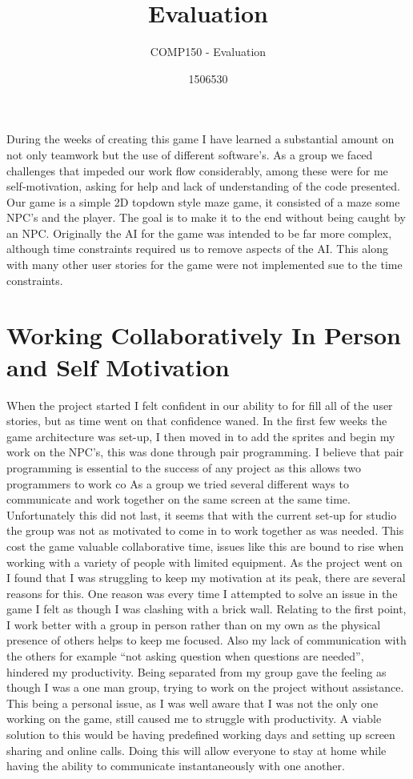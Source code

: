 \documentclass{scrartcl}
\title{Evaluation}
\subtitle{COMP150 - Evaluation}
\author{1506530}
\begin{document}
\maketitle
During the weeks of creating this game I have learned a substantial amount on not only teamwork but the use of different software's. As a group we faced challenges that impeded our work flow considerably, among these were for me self-motivation, asking for help and lack of understanding of the code presented. Our game is a simple 2D topdown style maze game, it consisted of a maze some NPC's and the player. The goal is to make it to the end without being caught by an NPC. Originally the AI for the game was intended to be far more complex, although time constraints required us to remove aspects of the AI. This along with many other user stories for the game were not implemented sue to the time constraints.

\section{Working Collaboratively In Person and Self Motivation}
When the project started I felt confident in our ability to for fill all of the user stories, but as time went on that confidence waned. In the first few weeks the game architecture was set-up, I then moved in to add the sprites and begin my work on the NPC's, this was done through pair programming. I believe that pair programming is essential to the success of any project as this allows two programmers to work co As a group we tried several different ways to communicate and work together on the same screen at the same time\cite{Radermacher:2011:IEI:1953163.1953346}. Unfortunately this did not last, it seems that with the current set-up for studio the group was not as motivated to come in to work together as was needed. This cost the game valuable collaborative time, issues like this are bound to rise when working with a variety of people with limited equipment. 
\newline
As the project went on I found that I was struggling to keep my motivation at its peak, there are several reasons for this. One reason was every time I attempted to solve an issue in the game I felt as though I was clashing with a brick wall. Relating to the first point, I work better with a group in person rather than on my own as the physical presence of others helps to keep me focused. Also my lack of communication with the others for example ``not asking question when questions are needed'', hindered my productivity. Being separated from my group gave the feeling as though I was a one man group, trying to work on the project without assistance. This being a personal issue, as I was well aware that I was not the only one working on the game, still caused me to struggle with productivity. A viable solution to this would be having predefined working days and setting up screen sharing and online calls. Doing this will allow everyone to stay at home while having the ability to communicate instantaneously with one another. 
\end{document}
